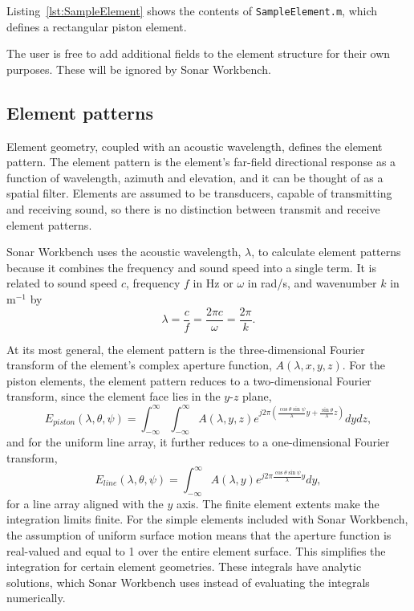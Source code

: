 Listing~\ref{lst:SampleElement} shows the contents of \texttt{SampleElement.m}, which defines a rectangular piston element.



The user is free to add additional fields to the element structure for their own purposes. These will be ignored by Sonar Workbench.

\subsection{Element patterns}

Element geometry, coupled with an acoustic wavelength, defines the element pattern. The element pattern is the element's far-field directional response as a function of wavelength, azimuth and elevation, and it can be thought of as a spatial filter. Elements are assumed to be transducers, capable of transmitting and receiving sound, so there is no distinction between transmit and receive element patterns. 

Sonar Workbench uses the acoustic wavelength, $\lambda$, to calculate element patterns because it combines the frequency and sound speed into a single term. It is related to sound speed $c$, frequency $f$ in Hz or $\omega$ in rad/s, and wavenumber $k$ in m$^{-1}$ by
\begin{equation*}
\lambda = \frac{c}{f} = \frac{2\pi{c}}{\omega} = \frac{2\pi}{k}.
\end{equation*}

At its most general, the element pattern is the three-dimensional Fourier transform of the element's complex aperture function, $A(\lambda,x,y,z)$. For the piston elements, the element pattern reduces to a two-dimensional Fourier transform, since the element face lies in the $y$-$z$ plane,
\begin{equation}
E_{piston}(\lambda,\theta,\psi) = \int_{-\infty}^\infty\int_{-\infty}^\infty A(\lambda,y,z)e^{j2\pi\left(\frac{\cos\theta\sin\psi}{\lambda}y + \frac{\sin\theta}{\lambda}z\right)}dydz,\label{eq:PlanarFT}
\end{equation}
and for the uniform line array, it further reduces to a one-dimensional Fourier transform,
\begin{equation}
E_{line}(\lambda,\theta,\psi) = \int_{-\infty}^\infty A(\lambda,y)e^{j2\pi\frac{\cos\theta\sin\psi}{\lambda}y}dy,\label{eq:LinearFT}
\end{equation}
for a line array aligned with the $y$ axis. The finite element extents make the integration limits finite. For the simple elements included with Sonar Workbench, the assumption of uniform surface motion means that the aperture function is real-valued and equal to 1 over the entire element surface. This simplifies the integration for certain element geometries. These integrals have analytic solutions, which Sonar Workbench uses instead of evaluating the integrals numerically.

